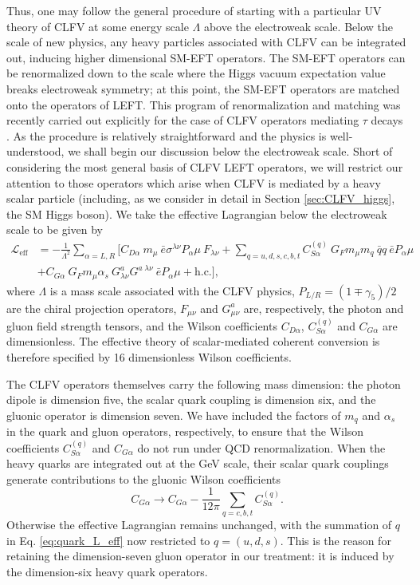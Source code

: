 \documentclass{book}[letterpaper,12pt]
\begin{document}
Thus, one may follow the general procedure of starting with a particular UV theory of CLFV at some energy scale $\Lambda$ above the electroweak scale. Below the scale of new physics, any heavy particles associated with CLFV can be integrated out, inducing higher dimensional SM-EFT operators. The SM-EFT operators can be renormalized down to the scale where the Higgs vacuum expectation value breaks electroweak symmetry; at this point, the SM-EFT operators are matched onto the operators of LEFT. This program of renormalization and matching was recently carried out explicitly for the case of CLFV operators mediating $\tau$ decays \cite{Cirigliano:2021img}. As the procedure is relatively straightforward and the physics is well-understood, we shall begin our discussion below the electroweak scale. Short of considering the most general basis of CLFV LEFT operators, we will restrict our attention to those operators which arise when CLFV is mediated by a heavy scalar particle (including, as we consider in detail in Section \ref{sec:CLFV_higgs}, the SM Higgs boson). We take the effective Lagrangian below the electroweak scale to be given by
\begin{equation}
\begin{split}
\mathcal{L}_\mathrm{eff}&=-\frac{1}{\Lambda^2}\sum_{\alpha=L,R}\bigg[C_{D\alpha}~m_{\mu}~\bar{e}\sigma^{\lambda\nu}P_{\alpha}\mu~F_{\lambda\nu}+\sum_{q=u,d,s,c,b,t}C^{(q)}_{S\alpha}~G_Fm_{\mu}m_q~\bar{q}q~\bar{e}P_{\alpha}\mu\\
&+C_{G\alpha}~G_Fm_{\mu}\alpha_s~G^a_{\lambda\nu}G^{a\;\lambda\nu}~\bar{e}P_{\alpha}\mu+\mathrm{h.c.}\bigg],
\label{eq:quark_L_eff}
\end{split}
\end{equation}
where $\Lambda$ is a mass scale associated with the CLFV physics, $P_{L/R}=\left(1\mp \gamma_5\right)/2$ are the chiral projection operators, $F_{\mu\nu}$ and $G^a_{\mu\nu}$ are, respectively, the photon and gluon field strength tensors, and the Wilson coefficients $C_{D\alpha}$, $C_{S\alpha}^{(q)}$ and $C_{G\alpha}$ are dimensionless. The effective theory of scalar-mediated coherent conversion is therefore specified by 16 dimensionless Wilson coefficients. 

The CLFV operators themselves carry the following mass dimension: the photon dipole is dimension five, the scalar quark coupling is dimension six, and the gluonic operator is dimension seven. We have included the factors of $m_q$ and $\alpha_s$ in the quark and gluon operators, respectively, to ensure that the Wilson coefficients $C_{S\alpha}^{(q)}$ and $C_{G\alpha}$ do not run under QCD renormalization. When the heavy quarks are integrated out at the GeV scale, their scalar quark couplings generate contributions to the gluonic Wilson coefficients
\begin{equation}
C_{G\alpha}\rightarrow C_{G\alpha}-\frac{1}{12\pi}\sum_{q=c,b,t}C^{(q)}_{S\alpha}.
\end{equation}
Otherwise the effective Lagrangian remains unchanged, with the summation of $q$ in Eq. \ref{eq:quark_L_eff} now restricted to $q=(u,d,s)$. This is the reason for retaining the dimension-seven gluon operator in our treatment: it is induced by the dimension-six heavy quark operators.
\end{document}
